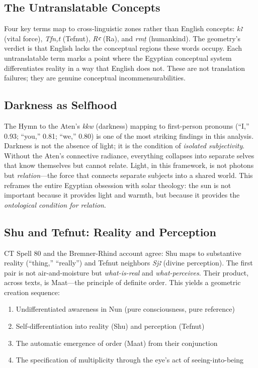 \documentclass[11pt, a4paper]{article}
\begin{document}
\subsection{The Untranslatable Concepts}

Four key terms map to cross-linguistic zones rather than English concepts: \textit{kꜣ} (vital force), \textit{Tfn,t} (Tefnut), \textit{Rꜥ} (Ra), and \textit{rmṯ} (humankind). The geometry's verdict is that English lacks the conceptual regions these words occupy. Each untranslatable term marks a point where the Egyptian conceptual system differentiates reality in a way that English does not. These are not translation failures; they are genuine conceptual incommensurabilities.

\subsection{Darkness as Selfhood}

The Hymn to the Aten's \textit{kkw} (darkness) mapping to first-person pronouns (``I,'' 0.93; ``you,'' 0.81; ``we,'' 0.80) is one of the most striking findings in this analysis. Darkness is not the absence of light; it is the condition of \textit{isolated subjectivity}. Without the Aten's connective radiance, everything collapses into separate selves that know themselves but cannot relate. Light, in this framework, is not photons but \textit{relation}---the force that connects separate subjects into a shared world. This reframes the entire Egyptian obsession with solar theology: the sun is not important because it provides light and warmth, but because it provides the \textit{ontological condition for relation}.

\subsection{Shu and Tefnut: Reality and Perception}

CT Spell 80 and the Bremner-Rhind account agree: Shu maps to substantive reality (``thing,'' ``really'') and Tefnut neighbors \textit{Sjꜣ} (divine perception). The first pair is not air-and-moisture but \textit{what-is-real} and \textit{what-perceives}. Their product, across texts, is Maat---the principle of definite order. This yields a geometric creation sequence:

\begin{enumerate}[nosep]
    \item Undifferentiated awareness in Nun (pure consciousness, pure reference)
    \item Self-differentiation into reality (Shu) and perception (Tefnut)
    \item The automatic emergence of order (Maat) from their conjunction
    \item The specification of multiplicity through the eye's act of seeing-into-being
\end{enumerate}
\end{document}
